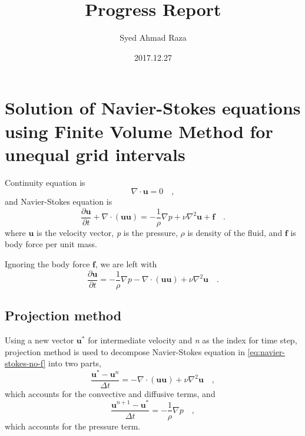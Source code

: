 \documentclass[12pt,a4paper,fleqn]{article}
\title{Progress Report}
\author{Syed Ahmad Raza}
\date{2017.12.27}
\begin{document}
\maketitle
\tableofcontents
\pagebreak

\section{Solution of Navier-Stokes equations using Finite Volume Method for unequal grid intervals}

Continuity equation is
\begin{equation}\label{eq:continuity}
\nabla \cdot \mathbf{u} = 0 \quad,
\end{equation}
and Navier-Stokes equation is
\begin{equation}\label{eq:navier-stokes}
\frac{\partial \mathbf{u}}{\partial t}+\nabla \cdot (\mathbf{u}\mathbf{u}) = -\frac{1}{\rho}\nabla p + \nu \nabla^2 \mathbf{u}+\mathbf{f} \quad.
\end{equation}
where $\mathbf{u}$ is the velocity vector, \textit{p} is the pressure, $\rho$ is density of the fluid, and $\mathbf{f}$ is body force per unit mass.

Ignoring the body force $\mathbf{f}$, we are left with
\begin{equation}\label{eq:navier-stokes-no-f}
\frac {\partial \mathbf{u}}{\partial t} = -\frac{1}{\rho}\nabla p -\nabla \cdot (\mathbf{uu}) + \nu \nabla^2 \mathbf{u} \quad.
\end{equation}

\subsection{Projection method}
Using a new vector $\mathbf{u}^*$ for intermediate velocity and \textit{n} as the index for time step, projection method is used to decompose Navier-Stokes equation in \eqref{eq:navier-stokes-no-f} into two parts,
\begin{equation}\label{eq:projection01}
\frac{\mathbf{u}^*-\mathbf{u}^n}{\Delta t} = -\nabla \cdot (\mathbf{u}\mathbf{u})+ \nu \nabla^2 \mathbf{u} \quad,
\end{equation}
which accounts for the convective and diffusive terms, and
\begin{equation}\label{eq:projection02}
\frac{\mathbf{u}^{n+1}-\mathbf{u}^*}{\Delta t}=-\frac{1}{\rho}\nabla p \quad,
\end{equation}
which accounts for the pressure term.
\end{document}
